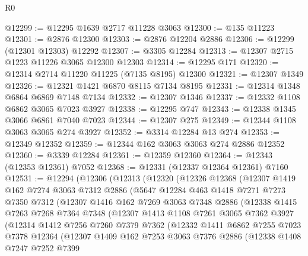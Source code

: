 \begin{lexlean}{R0}
\begin{coremodule}
@12299 := @12295 @1639 @2717 @11228 @3063
@12300 := @135 @11223
@12301 := @2876 @12300
@12303 := @2876 @12204 @2886
@12306 := @12299 (@12301 @12303) @12292
@12307 := @3305 @12284
@12313 := @12307 @2715 @1223 @11226 @3065 @12300 @12303
@12314 := @12295 @171
@12320 := @12314 @2714 @11220 @11225 (@7135 @8195) @12300
@12321 := @12307 @1349
@12326 := @12321 @1421 @6870 @8115 @7134 @8195
@12331 := @12314 @1348 @6864 @6869 @7148 @7134
@12332 := @12307 @1346
@12337 := @12332 @1108 @6862 @3065 @7023 @3927
@12338 := @12295 @747
@12343 := @12338 @1345 @3066 @6861 @7040 @7023
@12344 := @12307 @275
@12349 := @12344 @1108 @3063 @3065 @274 @3927
@12352 := @3314 @12284 @13 @274
@12353 := @12349 @12352
@12359 := @12344 @162 @3063 @3063 @274 @2886 @12352
@12360 := @3339 @12284
@12361 := @12359 @12360
@12364 := @12343 (@12353 @12361) @7052
@12368 := @12331 (@12337 @12364 @12361) @7160
@12531 := @12294
    (@12306
      (@12313
        (@12320
          (@12326
            @12368
            (@12307
              @1419
              @162
              @7274
              @3063
              @7312
              @2886
              (@5647
                @12284
                @463
                @1418
                @7271
                @7273
                @7350
                @7312
                (@12307
                  @1416
                  @162
                  @7269
                  @3063
                  @7348
                  @2886
                  (@12338
                    @1415
                    @7263
                    @7268
                    @7364
                    @7348
                    (@12307
                      @1413
                      @1108
                      @7261
                      @3065
                      @7362
                      @3927
                      (@12314
                        @1412
                        @7256
                        @7260
                        @7379
                        @7362
                        (@12332
                          @1411
                          @6862
                          @7255
                          @7023
                          @7378
                          @12364
                          (@12307
                            @1409
                            @162
                            @7253
                            @3063
                            @7376
                            @2886
                            (@12338
                              @1408
                              @7247
                              @7252
                              @7399

\end{coremodule}
\end{lexlean}
